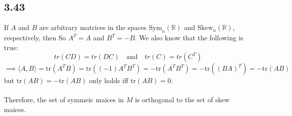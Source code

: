\documentclass[letterpaper,12pt]{article}
\theoremstyle{definition}
\begin{document}
\subsection*{3.43}

If $A$ and $B$ are arbitrary matrices in the spaces $\text{Sym}_n(\mathbb{R})$ and $\text{Skew}_n(\mathbb{R})$, respectively, then So $A^T = A$ and $B^T = -B$. We also know that the following is true:
\[tr(CD) = tr(DC) \quad\text{and}\quad tr(C) = tr(C^T)\]
\[\implies \langle A,B \rangle = \text{tr}(A^TB) = \text{tr}((-1)A^TB^T) =  -\text{tr}(A^TB^T) = -\text{tr}((BA)^T) =  -\text{tr}(AB)\] but $\text{tr}(AB) = -\text{tr}(AB)$ only holds iff $\text{tr}(AB) =  0$. \\\\
Therefore, the set of symmeic maices in $M$ is orthogonal to the set of skew maices.
\end{document}
